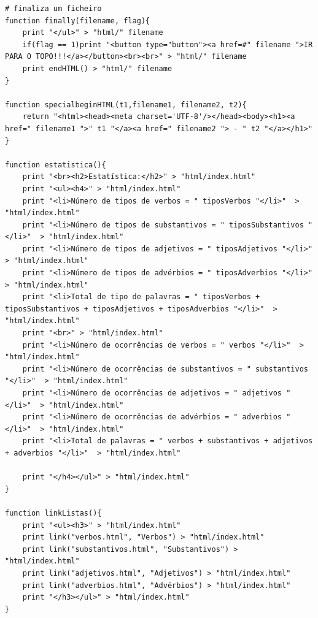 \documentclass[11pt,a4paper]{report}%
\begin{document}
\begin{verbatim}
# finaliza um ficheiro
function finally(filename, flag){
	print "</ul>" > "html/" filename
	if(flag == 1)print "<button type="button"><a href=#" filename ">IR PARA O TOPO!!!</a></button><br><br>" > "html/" filename
	print endHTML() > "html/" filename
}

function specialbeginHTML(t1,filename1, filename2, t2){
	return "<html><head><meta charset='UTF-8'/></head><body><h1><a href=" filename1 ">" t1 "</a><a href=" filename2 "> - " t2 "</a></h1>"
}

function estatistica(){
	print "<br><h2>Estatística:</h2>" > "html/index.html"
	print "<ul><h4>" > "html/index.html"
	print "<li>Número de tipos de verbos = " tiposVerbos "</li>"  > "html/index.html"
	print "<li>Número de tipos de substantivos = " tiposSubstantivos "</li>"  > "html/index.html"
	print "<li>Número de tipos de adjetivos = " tiposAdjetivos "</li>"  > "html/index.html"
	print "<li>Número de tipos de advérbios = " tiposAdverbios "</li>"  > "html/index.html"
	print "<li>Total de tipo de palavras = " tiposVerbos + tiposSubstantivos + tiposAdjetivos + tiposAdverbios "</li>"  > "html/index.html"
	print "<br>" > "html/index.html"
	print "<li>Número de ocorrências de verbos = " verbos "</li>"  > "html/index.html"
	print "<li>Número de ocorrências de substantivos = " substantivos "</li>"  > "html/index.html"
	print "<li>Número de ocorrências de adjetivos = " adjetivos "</li>"  > "html/index.html"
	print "<li>Número de ocorrências de advérbios = " adverbios "</li>"  > "html/index.html"
	print "<li>Total de palavras = " verbos + substantivos + adjetivos + adverbios "</li>"  > "html/index.html"

	print "</h4></ul>" > "html/index.html"
}

function linkListas(){
	print "<ul><h3>" > "html/index.html"
	print link("verbos.html", "Verbos") > "html/index.html"
	print link("substantivos.html", "Substantivos") > "html/index.html"
	print link("adjetivos.html", "Adjetivos") > "html/index.html"
	print link("adverbios.html", "Advérbios") > "html/index.html"
	print "</h3></ul>" > "html/index.html"
}
\end{verbatim}
\end{document}
